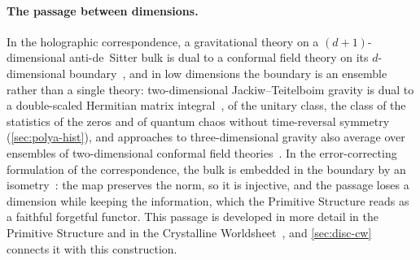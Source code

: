 \paragraph{The passage between dimensions.}
In the holographic correspondence, a gravitational theory on a $(d+1)$-dimensional anti-de~Sitter bulk
is dual to a conformal field theory on its $d$-dimensional boundary~\cite{maldacena98}, and in low dimensions the boundary is an ensemble rather than a single theory: two-dimensional Jackiw--Teitelboim gravity is dual to a double-scaled Hermitian matrix integral~\cite{saad19}, of the
unitary class, the class of the statistics of the zeros and of quantum chaos without time-reversal symmetry
(\cref{sec:polya-hist}), and approaches to three-dimensional gravity also average over ensembles of two-dimensional conformal field theories~\cite{cooper26}.  In the error-correcting formulation of the
correspondence, the bulk is embedded in the boundary by an isometry~\cite{almheiri15,pastawski15}: the
map preserves the norm, so it is injective, and the passage loses a dimension while keeping the
information, which the Primitive Structure reads as a faithful forgetful functor.  This passage is developed in more
detail in the Primitive Structure and in the Crystalline Worldsheet~\cite{gonzalez25hp,gonzalez26cw}, and \cref{sec:disc-cw}
connects it with this construction.

